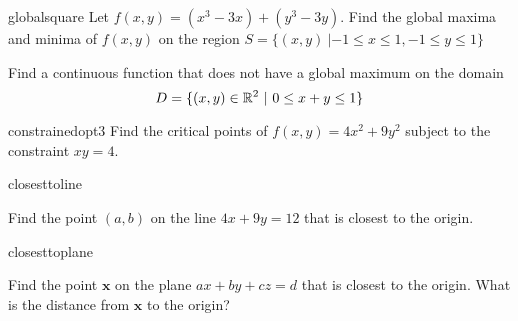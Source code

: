 \begin{problem}{globalsquare}
    Let $f(x,y) = (x^3 - 3x) + (y^3-3y)$.  Find the global maxima and minima of $f(x,y)$ on the region $S = \{(x,y) \ | -1 \leq x \leq 1, -1 \leq y \leq 1\}$
\end{problem}

\begin{problem}
    Find a continuous function that does not have a global maximum on the domain $$D = \{(x,y) \in \mathbb{R}^2 \ | \ 0 \leq x + y \leq 1 \}$$
\end{problem}


\begin{problem}{constrainedopt3}
    Find the critical points of $f(x,y) = 4x^2+9y^2$ subject to the constraint $xy=4$.  
\end{problem}

\begin{problem}{closesttoline}

Find the point $(a,b)$ on the line $4x+9y=12$ that is closest to the origin.
   
\end{problem}

\begin{problem}{closesttoplane}

Find the point $\bm{x}$ on the plane $ax + by + cz = d$ that is closest to the origin.  What is the distance from $\bm{x}$ to the origin?
   
\end{problem}